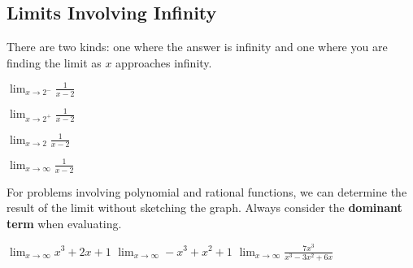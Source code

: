 \documentclass[addpoints, 12pt]{exam}
\begin{document}
\subsection*{Limits Involving Infinity}
There are two kinds: one where the answer is infinity and one where you are finding the limit as $x$ approaches infinity.
\begin{questions}
    \begin{minipage}{0.45\linewidth}
    \question $\displaystyle\lim_{x\to2^-}\frac{1}{x-2}$
    \end{minipage}
    \hfill
    \begin{minipage}{0.45\linewidth}
    \question $\displaystyle\lim_{x\to2^+}\frac{1}{x-2}$
    \end{minipage}
    
    
    \begin{minipage}{0.45\linewidth}
    \question $\displaystyle\lim_{x\to2}\frac{1}{x-2}$
    \end{minipage}
    \hfill
    \begin{minipage}{0.45\linewidth}
    \question $\displaystyle\lim_{x\to\infty}\frac{1}{x-2}$
    \end{minipage}
    
\end{questions}
For problems involving polynomial and rational functions, we can determine the result of the limit without sketching the graph. Always consider the \textbf{dominant term} when evaluating.

\begin{questions}
    \question $\displaystyle\lim_{x\to\infty}x^3+2x+1$
    \question $\displaystyle\lim_{x\to\infty}-x^3+x^2+1$
    \question $\displaystyle\lim_{x\to\infty}\frac{7x^3}{x^3-3x^2+6x}$
\end{questions}

\newpage
\end{document}
